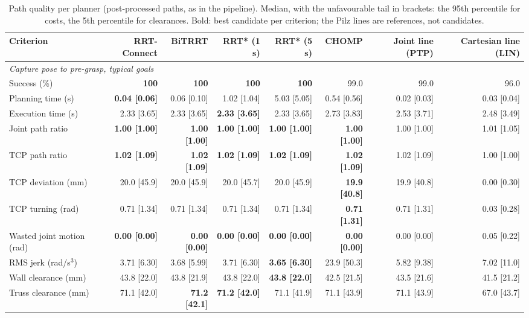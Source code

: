 \begin{table}[t]
\centering
\scriptsize
\caption{Path quality per planner (post-processed paths, as in the pipeline). Median, with the unfavourable tail in brackets: the 95th percentile for costs, the 5th percentile for clearances. Bold: best candidate per criterion; the Pilz lines are references, not candidates.}
\label{tab:planner_quality}
\setlength{\tabcolsep}{3pt}
\begin{tabular}{lrrrrrrr}
\toprule
Criterion & RRT-Connect & BiTRRT & RRT* (1 s) & RRT* (5 s) & CHOMP & Joint line (PTP) & Cartesian line (LIN) \\
\midrule
\multicolumn{8}{l}{\emph{Capture pose to pre-grasp, typical goals}} \\
Success (\%) & \textbf{100} & \textbf{100} & \textbf{100} & \textbf{100} & 99.0 & 99.0 & 96.0 \\
Planning time (s) & \textbf{0.04 [0.06]} & 0.06 [0.10] & 1.02 [1.04] & 5.03 [5.05] & 0.54 [0.56] & 0.02 [0.03] & 0.03 [0.04] \\
Execution time (s) & 2.33 [3.65] & 2.33 [3.65] & \textbf{2.33 [3.65]} & 2.33 [3.65] & 2.73 [3.83] & 2.53 [3.71] & 2.48 [3.49] \\
Joint path ratio & \textbf{1.00 [1.00]} & \textbf{1.00 [1.00]} & \textbf{1.00 [1.00]} & \textbf{1.00 [1.00]} & \textbf{1.00 [1.00]} & 1.00 [1.00] & 1.01 [1.05] \\
TCP path ratio & \textbf{1.02 [1.09]} & \textbf{1.02 [1.09]} & \textbf{1.02 [1.09]} & \textbf{1.02 [1.09]} & \textbf{1.02 [1.09]} & 1.02 [1.09] & 1.00 [1.00] \\
TCP deviation (mm) & 20.0 [45.9] & 20.0 [45.9] & 20.0 [45.7] & 20.0 [45.9] & \textbf{19.9 [40.8]} & 19.9 [40.8] & 0.00 [0.30] \\
TCP turning (rad) & 0.71 [1.34] & 0.71 [1.34] & 0.71 [1.34] & 0.71 [1.34] & \textbf{0.71 [1.31]} & 0.71 [1.31] & 0.03 [0.28] \\
Wasted joint motion (rad) & \textbf{0.00 [0.00]} & \textbf{0.00 [0.00]} & \textbf{0.00 [0.00]} & \textbf{0.00 [0.00]} & \textbf{0.00 [0.00]} & 0.00 [0.00] & 0.05 [0.22] \\
RMS jerk (rad/s$^3$) & 3.71 [6.30] & 3.68 [5.99] & 3.71 [6.30] & \textbf{3.65 [6.30]} & 23.9 [50.3] & 5.82 [9.38] & 7.02 [11.0] \\
Wall clearance (mm) & 43.8 [22.0] & 43.8 [21.9] & 43.8 [22.0] & \textbf{43.8 [22.0]} & 42.5 [21.5] & 43.5 [21.6] & 41.5 [21.2] \\
Truss clearance (mm) & 71.1 [42.0] & \textbf{71.2 [42.1]} & \textbf{71.2 [42.0]} & 71.1 [41.9] & 71.1 [43.9] & 71.1 [43.9] & 67.0 [43.7] \\

\end{tabular}
\end{table}
